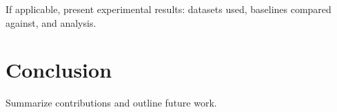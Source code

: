 \documentclass[11pt,a4paper]{article}
\begin{document}
If applicable, present experimental results: datasets used, baselines compared
against, and analysis.


\section{Conclusion}

Summarize contributions and outline future work.



\end{document}
